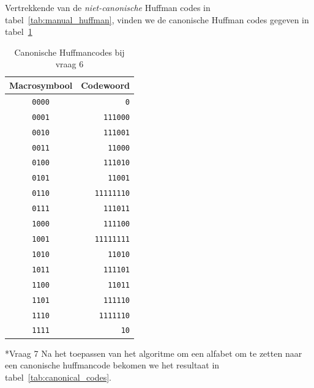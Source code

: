 \documentclass[]{article}
\begin{document}
\begin{section}
\begin{subsection}
        Vertrekkende van de \emph{niet-canonische} Huffman codes in
        tabel~\ref{tab:manual_huffman}, vinden we de canonische
        Huffman codes gegeven in tabel~\ref{tab:canonical_huffman}

        \begin{table}
            \centering
            \begin{tabular}{c|r}
                \textbf{Macrosymbool} &
                \textbf{Codewoord} \\
                \hline
                \texttt{0000} & \texttt{0} \\
                \texttt{0001} & \texttt{111000} \\
                \texttt{0010} & \texttt{111001} \\
                \texttt{0011} & \texttt{11000} \\
                \texttt{0100} & \texttt{111010} \\
                \texttt{0101} & \texttt{11001} \\
                \texttt{0110} & \texttt{11111110} \\
                \texttt{0111} & \texttt{111011} \\
                \texttt{1000} & \texttt{111100} \\
                \texttt{1001} & \texttt{11111111} \\
                \texttt{1010} & \texttt{11010} \\
                \texttt{1011} & \texttt{111101} \\
                \texttt{1100} & \texttt{11011} \\
                \texttt{1101} & \texttt{111110} \\
                \texttt{1110} & \texttt{1111110} \\
                \texttt{1111} & \texttt{10} \\
            \end{tabular}
            \caption{Canonische Huffmancodes bij vraag 6}
            \label{tab:canonical_huffman}
        \end{table}

    \end{subsection}

    \begin{subsection}*{Vraag 7}
        Na het toepassen van het algoritme om een alfabet om te zetten
        naar een canonische huffmancode bekomen we het resultaat in
        tabel~\ref{tab:canonical_codes}.


\end{subsection}
\end{section}
\end{document}
